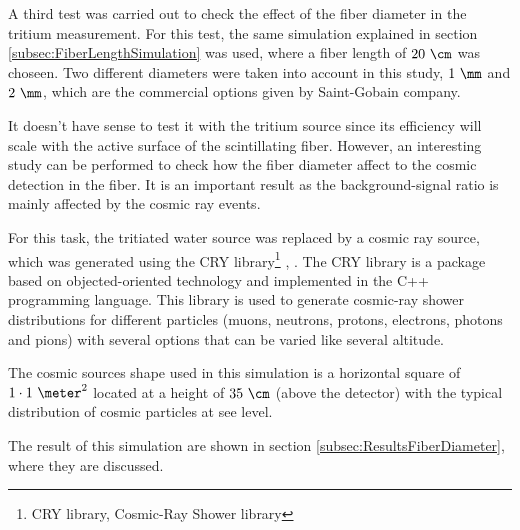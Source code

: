 A third test was carried out to check the effect of the fiber diameter in the tritium measurement. For this test, the same simulation explained in section \ref{subsec:FiberLengthSimulation} was used, where a fiber length of $20~\cm$ was choseen. Two different diameters were taken into account in this study, $1~\mm$ and $2~\mm$, which are the commercial options given by Saint-Gobain company.

It doesn't have sense to test it with the tritium source since its efficiency will scale with the active surface of the scintillating fiber. However, an interesting study can be performed to check how the fiber diameter affect to the cosmic detection in the fiber. It is an important result as the background-signal ratio is mainly affected by the cosmic ray events.

For this task, the tritiated water source was replaced by a cosmic ray source, which was generated using the CRY library\footnote{CRY library, Cosmic-Ray Shower library} \cite{CRYwebsite}, \cite{CRYpaper}. The CRY library is a package based on objected-oriented technology and implemented in the C++ programming language. This library is used to generate cosmic-ray shower distributions for different particles (muons, neutrons, protons, electrons, photons and pions) with several options that can be varied like several altitude.

The cosmic sources shape used in this simulation is a horizontal square of $1\cdot 1~\meter ^2$ located at a height of $35~\cm$ (above the detector) with the typical distribution of cosmic particles at see level.

The result of this simulation are shown in section \ref{subsec:ResultsFiberDiameter}, where they are discussed.